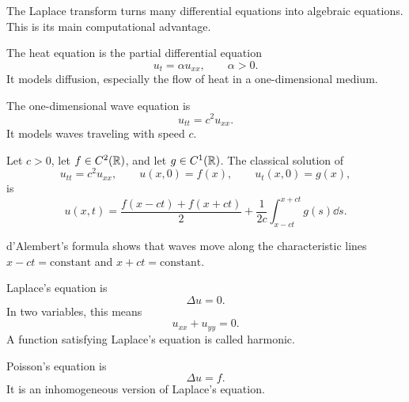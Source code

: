     \begin{remark}
        The Laplace transform turns many differential equations into algebraic
        equations. This is its main computational advantage.
    \end{remark}

    \begin{definition}
        The heat equation is the partial differential equation
        \[
            u_t=\alpha u_{xx},
            \qquad
            \alpha>0.
        \]
        It models diffusion, especially the flow of heat in a one-dimensional
        medium.
    \end{definition}

    \begin{definition}
        The one-dimensional wave equation is
        \[
            u_{tt}=c^2u_{xx}.
        \]
        It models waves traveling with speed $c$.
    \end{definition}

    \begin{theorem}
        Let $c>0$, let $f\in C^2(\mathbb{R})$, and let $g\in C^1(\mathbb{R})$. The classical
        solution of
        \[
            u_{tt}=c^2u_{xx},
            \qquad
            u(x,0)=f(x),
            \qquad
            u_t(x,0)=g(x),
        \]
        is
        \[
            u(x,t)
            =
            \frac{f(x-ct)+f(x+ct)}{2}
            +
            \frac{1}{2c}\int_{x-ct}^{x+ct}g(s)\dd s.
        \]
    \end{theorem}

    \begin{remark}
        d'Alembert's formula shows that waves move along the characteristic
        lines $x-ct=\text{constant}$ and $x+ct=\text{constant}$.
    \end{remark}

    \begin{definition}
        Laplace's equation is
        \[
            \Delta u=0.
        \]
        In two variables, this means
        \[
            u_{xx}+u_{yy}=0.
        \]
        A function satisfying Laplace's equation is called harmonic.
    \end{definition}

    \begin{definition}
        Poisson's equation is
        \[
            \Delta u=f.
        \]
        It is an inhomogeneous version of Laplace's equation.
    \end{definition}

